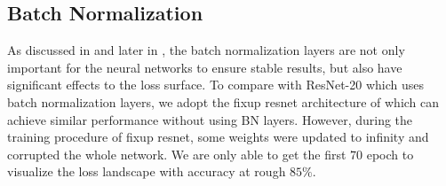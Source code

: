 \subsection{Batch Normalization}
\label{sec:batch_norm}

As discussed in \cite{li2018visualizing} and later in \cite{zhang2018fixup}, the batch normalization layers are not only important for the neural networks to ensure stable results, but also have significant effects to the loss surface. 
To compare with ResNet-20 which uses batch normalization layers, we adopt the fixup resnet architecture of \cite{zhang2018fixup} which can achieve similar performance without using BN layers. 
However, during the training procedure of fixup resnet, some weights were updated to infinity and corrupted the whole network. 
We are only able to get the first $70$ epoch to visualize the loss landscape with accuracy at rough $85\%$. 


